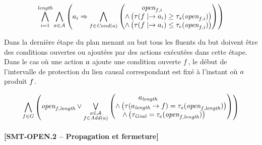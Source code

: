\begin{small}
\[
\BigforallTwo{i=1}{\length}\bigwedge\limits_{\substack{\a\in \A}}%
\left(\a_{i} \Rightarrow \Bigforall{\substack{\f\in \cond{\a}}}\begin{pmatrix}\open{\f}{i}\hfill\\ \wedge \left(\tau(\f\mid\rightarrow\a_{i}) \geq \tau_{s}(\open{\f}{i})\right)\hfill\\
 \wedge \left(\tau(\f\mid\rightarrow\a_{i}) \leq \tau_{e}(\open{\f}{i})\right)\end{pmatrix}\right)%
\]
\end{small}

Dans la dernière étape du plan menant au but tous les fluents du but doivent être des conditions ouvertes ou ajoutées par des actions exécutées dans cette étape. Dans le cas où une action $a$ ajoute une condition ouverte $f$, le début de l'intervalle de protection du lien causal correspondant est fixé à l'instant où $a$ produit $f$.

\begin{small}
\[
\Bigforall{\substack{\f\in \G}}\begin{pmatrix}\open{\f}{\length} %
\vee \Bigexists{\substack{\a\in \A\\\f \in \add{\a}}}\begin{pmatrix}\a_{\length}\hfill\\
 \wedge \left(\tau(\a_{\length}\rightarrow \f) = \tau_{s}(\open{\f}{\length})\right)\hfill\\
  \wedge \left(\tau_{\mathit{Goal}} = \tau_{e}(\open{\f}{\length})\right)\hfill\end{pmatrix}\end{pmatrix}\hfill\\[-2em]
%
\]
\end{small}


\paragraph*{[SMT-OPEN.2 -- Propagation et fermeture]}

